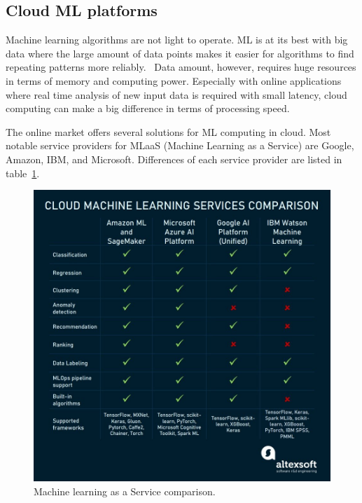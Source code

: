 

\subsection{Cloud ML platforms}\label{subsec:bg-cloud-ml-platforms}

Machine learning algorithms are not light to operate.
ML is at its best with big data
where the large amount of data points
makes it easier for algorithms
to find repeating patterns more reliably.~\cite{zhou2017machine}
Data amount, however,
requires huge resources in terms of memory and computing power.
Especially with online applications
where real time analysis of new input data is required
with small latency,
cloud computing can make a big difference
in terms of processing speed.

The online market offers several solutions for ML computing in cloud.
Most notable service providers for
MLaaS (Machine Learning as a Service)
are Google, Amazon, IBM, and Microsoft.
Differences of each service provider are listed in table~\ref{fig:mlaas-comparison}.

\begin{figure}[htb]
    \centering
    \includegraphics[width=150mm]{./appendices/mlaas-comparison}
    \caption{Machine learning as a Service comparison.~\cite{altexsoft2021mlaas}
    \label{fig:mlaas-comparison}}
\end{figure}

